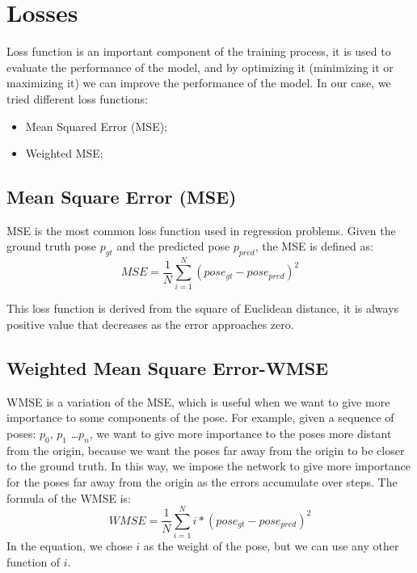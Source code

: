 \section{Losses}\label{sec:losses}
Loss function is an important component of the training process, it is used to evaluate the performance of the model, and by optimizing it (minimizing it or maximizing it) we can improve the performance of the model.
In our case, we tried different loss functions:
\begin{itemize}
    \item Mean Squared Error (MSE);
    \item Weighted MSE;
\end{itemize}

\subsection[Mean Square Error]{Mean Square Error (MSE)}\label{subsec:mean-square-error-(mse)}
MSE is the most common loss function used in regression problems.
Given the ground truth pose $p_{gt}$ and the predicted pose $p_{pred}$, the MSE is defined as:
\begin{equation}
    \label{eq:mean-square-error}
    MSE = \frac{1}{N} \sum_{i=1}^{N} (pose_{gt} - pose_{pred})^2
\end{equation}

This loss function is derived from the square of Euclidean distance, it is always positive value that decreases as the error approaches zero.

\subsection[Weighted Mean Square Error]{Weighted Mean Square Error-WMSE}\label{subsec:weighted-mean-square-error-wmse}
WMSE is a variation of the MSE, which is useful when we want to give more importance to some components of the pose.
For example, given a sequence of poses: $p_0$, $p_1$ \dots $p_n$, we want to give more importance to the poses more distant from the origin, because we want the poses far away from the origin to be closer to the ground truth.
In this way, we impose the network to give more importance for the poses far away from the origin as the errors accumulate over steps.
The formula of the WMSE is:
\begin{equation}
    \label{eq:weighted-mean-square-error}
    WMSE = \frac{1}{N} \sum_{i=1}^{N} i * (pose_{gt} - pose_{pred})^2
\end{equation}
In the equation, we chose $i$ as the weight of the pose, but we can use any other function of $i$.
